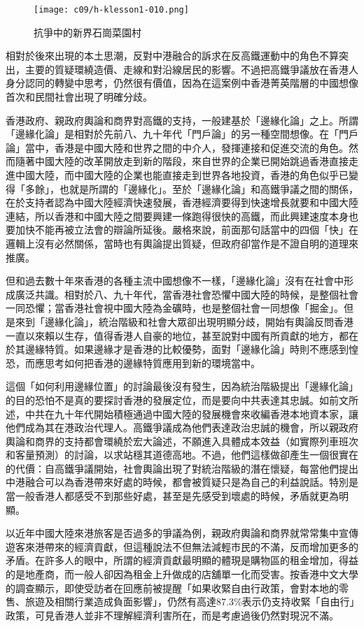\begin{figure}[htbp]
    \centering
    \texttt{[image: c09/h-klesson1-010.png]}
    \caption{抗爭中的新界石崗菜園村} 
\end{figure}

相對於後來出現的本土思潮，反對中港融合的訴求在反高鐵運動中的角色不算突出，主要的質疑環繞造價、走線和對沿線居民的影響。不過把高鐵爭議放在香港人身分認同的轉變中思考，仍然很有價值，因為在這案例中香港菁英階層的中國想像首次和民間社會出現了明確分歧。

香港政府、親政府輿論和商界對高鐵的支持，一般建基於「邊緣化論」之上。所謂「邊緣化論」是相對於先前八、九十年代「門戶論」的另一種空間想像。在「門戶論」當中，香港是中國大陸和世界之間的中介人，發揮連接和促進交流的角色。然而隨著中國大陸的改革開放走到新的階段，來自世界的企業已開始跳過香港直接走進中國大陸，而中國大陸的企業也能直接走到世界各地投資，香港的角色似乎已變得「多餘」，也就是所謂的「邊緣化」。至於「邊緣化論」和高鐵爭議之間的關係，在於支持者認為中國大陸經濟快速發展，香港經濟要得到快速增長就要和中國大陸連結，所以香港和中國大陸之間要興建一條跑得很快的高鐵，而此興建速度本身也要加快不能再被立法會的辯論所延後。嚴格來說，前面那句話當中的四個「快」在邏輯上沒有必然關係，當時也有輿論提出質疑，但政府卻當作是不證自明的道理來推廣。

但和過去數十年來香港的各種主流中國想像不一樣，「邊緣化論」沒有在社會中形成廣泛共識。相對於八、九十年代，當香港社會恐懼中國大陸的時候，是整個社會一同恐懼；當香港社會視中國大陸為金礦時，也是整個社會一同想像「掘金」。但是來到「邊緣化論」，統治階級和社會大眾卻出現明顯分歧，開始有輿論反問香港一直以來賴以生存，值得香港人自豪的地位，甚至說對中國有所貢獻的地方，都在於其邊緣特質。如果邊緣才是香港的比較優勢，面對「邊緣化論」時則不應感到惶恐，而應思考如何把香港的邊緣特質應用到新的環境當中。

這個「如何利用邊緣位置」的討論最後沒有發生，因為統治階級提出「邊緣化論」的目的恐怕不是真的要探討香港的發展定位，而是要向中共表達其忠誠。如前文所述，中共在九十年代開始積極通過中國大陸的發展機會來收編香港本地資本家，讓他們成為其在港政治代理人。高鐵爭議成為他們表達政治忠誠的機會，所以親政府輿論和商界的支持都會環繞於宏大論述，不願進入具體成本效益（如實際列車班次和客量預測）的討論，以求站穩其道德高地。不過，他們這樣做卻產生一個很實在的代價：自高鐵爭議開始，社會輿論出現了對統治階級的潛在懷疑，每當他們提出中港融合可以為香港帶來好處的時候，都會被質疑只是為自己的利益說話。特別是當一般香港人都感受不到那些好處，甚至是先感受到壞處的時候，矛盾就更為明顯。

以近年中國大陸來港旅客是否過多的爭議為例，親政府輿論和商界就常常集中宣傳遊客來港帶來的經濟貢獻，但這種說法不但無法減輕市民的不滿，反而增加更多的矛盾。在許多人的眼中，所謂的經濟貢獻最明顯的體現是購物區的租金增加，得益的是地產商，而一般人卻因為租金上升做成的店舖單一化而受害。按香港中文大學的調查顯示，即使受訪者在回應前被提醒「如果收緊自由行政策，會對本地的零售、旅遊及相關行業造成負面影響」，仍然有高達87.3\%表示仍支持收緊「自由行」政策，可見香港人並非不理解經濟利害所在，而是考慮過後仍然對現況不滿。


